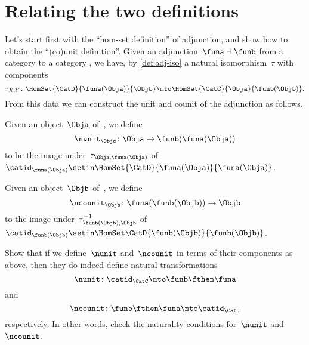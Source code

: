 
\section{Relating the two definitions}
\label{relate-adj-defs}

Let's start first with the ``hom-set definition'' of adjunction, and show how to obtain the ``(co)unit definition''.
Given an adjunction~$\funa \dashv \funb$ from a category \CatC to a category \CatD, we have, by \cref{def:adj-iso} a natural isomorphism~$\tau$ with components
\begin{equation*}
    \tau_{X,Y} \colon \HomSet{\CatD}{\funa(\Obja)}{\Objb} \mto \HomSet{\CatC}{\Obja}{\funb(\Objb)}.
\end{equation*}
From this data we can construct the unit and counit of the adjunction as follows.

Given an object~$\Obja$ of~\CatC, we define
\begin{equation*}
    \nunit_\Objc \colon \Obja \to \funb(\funa(\Obja))
\end{equation*}
to be the image under~$\tau_{\Obja, \funa(\Obja)}$ of~$\catid_{\funa(\Obja)} \setin \HomSet{\CatD}{\funa (\Obja)}{\funa(\Obja)}$.

Given an object~$\Objb$ of~\CatD, we define
\begin{equation*}
    \ncounit_\Objb \colon \funa(\funb(\Objb)) \to \Objb
\end{equation*}
to the image under~$\tau_{\funb(\Objb), \Objb}^{-1}$ of~$\catid_{\funb(\Objb)} \setin \HomSet\CatD{\funb(\Objb)}{\funb(\Objb)}$.

\begin{exercise}
    \label{ex:eta-epsilon}

    Show that if we define~$\nunit$ and~$\ncounit$ in terms of their components as above, then they do indeed define natural transformations
    \begin{equation*}
        \nunit\colon \catid_{\CatC} \nto \funb\fthen \funa
    \end{equation*}
    and
    \begin{equation*}
        \ncounit\colon \funb \fthen \funa \nto \catid_{\CatD}
    \end{equation*}
    respectively.
    In other words, check the naturality conditions for~$\nunit$ and~$\ncounit$.
\end{exercise}
\begin{solution}
    \missingsolution
\end{solution}

